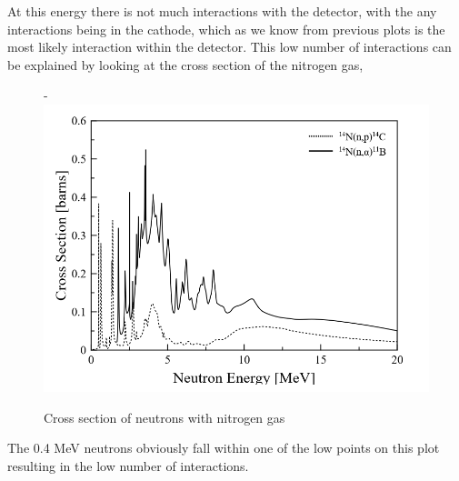 \documentclass[a4paper]{article}
\begin{document}
\noindent At this energy there is not much interactions with the detector, with the any interactions being in the cathode, which as we know from previous plots is the most likely interaction within the detector. This low number of interactions can be explained by looking at the cross section of the nitrogen gas, 
\begin{figure}[H]-
        \centering
        \includegraphics[width=1\linewidth]{Fast/cross.png}
        \caption{Cross section of neutrons with nitrogen gas}
        \label{fig:south2d}
        \end{figure}
\noindent The 0.4 MeV neutrons obviously fall within one of the low points on this plot resulting in the low number of interactions.
\end{document}
